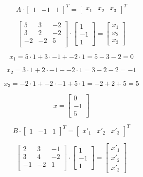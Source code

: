 \documentclass{article}
\begin{document}
\[
A \cdot \begin{bmatrix}1 & -1 & 1\end{bmatrix}^{T} = 
\begin{bmatrix}x_1 & x_2 & x_3 \end{bmatrix}^{T}
\]

\[
\begin{bmatrix}
5 & 3 & -2 \\
3 & 2 & -2 \\
-2 & -2 & 5 \\
\end{bmatrix} 
\cdot
\begin{bmatrix}
1 \\ -1 \\ 1
\end{bmatrix} 
=
\begin{bmatrix}
x_1 \\ x_2 \\ x_3
\end{bmatrix} 
\]

\[
x_1 = 5 \cdot 1 + 3 \cdot -1 + -2 \cdot 1 = 5 - 3 - 2 = 0 
\]

\[
x_2 = 3 \cdot 1 + 2 \cdot -1 + -2 \cdot 1 = 3 - 2 - 2 = -1 
\]

\[
x_3 = -2 \cdot 1 + -2 \cdot -1 + 5 \cdot 1 = -2 + 2 + 5 = 5 
\]

\[
x =
\begin{bmatrix}
    0 \\ -1 \\ 5
\end{bmatrix} 
\]

\[
B \cdot \begin{bmatrix}1 & -1 & 1\end{bmatrix}^{T} = 
\begin{bmatrix}x'_1 & x'_2 & x'_3 \end{bmatrix}^{T}
\]

\[
\begin{bmatrix}
2 & 3 & -1 \\
3 & 4 & -2 \\
-1 & -2 & 1 \\
\end{bmatrix} 
\cdot
\begin{bmatrix}
1 \\ -1 \\ 1
\end{bmatrix} 
=
\begin{bmatrix}
x'_1 \\ x'_2 \\ x'_3
\end{bmatrix} 
\]
\end{document}
